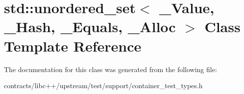 \hypertarget{classstd_1_1unordered__set}{}\section{std\+:\+:unordered\+\_\+set$<$ \+\_\+\+Value, \+\_\+\+Hash, \+\_\+\+Equals, \+\_\+\+Alloc $>$ Class Template Reference}
\label{classstd_1_1unordered__set}


The documentation for this class was generated from the following file\+:\begin{DoxyCompactItemize}
\item 
contracts/libc++/upstream/test/support/container\+\_\+test\+\_\+types.\+h\end{DoxyCompactItemize}
